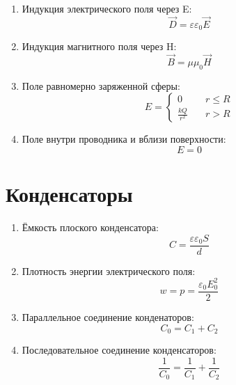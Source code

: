 \begin{enumerate}
		\item Индукция электрического поля через E: \[ \overrightarrow{D} = \varepsilon \varepsilon_0 \overrightarrow{E}\]
		\item Индукция магнитного поля через H: \[ \overrightarrow{B} = \mu \mu_0 \overrightarrow{H} \]
		\item Поле равномерно заряженной сферы: \[ E = 
		\begin{cases}
			0 & \quad r \leq R \\
			\frac{kQ}{r^2} & \quad r > R
		\end{cases} \]
		\item Поле внутри проводника и вблизи поверхности: \[ E = 0 \]
	\end{enumerate}
	
	
	\section{Конденсаторы}
	\begin{enumerate}
		\item Ёмкость плоского конденсатора: \[ C = \frac{\varepsilon \varepsilon_0 S}{d} \]
		\item Плотность энергии электрического поля: \[ w = p = \frac{\varepsilon_0 E_0^2}{2} \]
		\item Параллельное соединение конденаторов: \[ C_0 = C_1 + C_2 \]
		\item Последовательное соединение конденсаторов: \[ \frac{1}{C_0} = \frac{1}{C_1} + \frac{1}{C_2} \]
	\end{enumerate}
	
